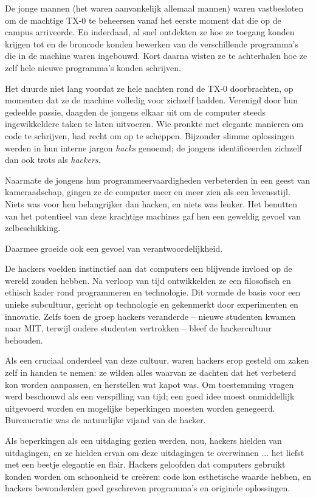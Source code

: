 \documentclass[
  a5paper,
  smalldemyvopaper,11pt,twoside,onecolumn,openright,extrafontsizes,
hidelinks]{memoir}
\begin{document}
De jonge mannen (het waren aanvankelijk allemaal mannen) waren
vastbesloten om de machtige TX-0 te beheersen vanaf het eerste moment
dat die op de campus arriveerde. En inderdaad, al snel ontdekten ze hoe
ze toegang konden krijgen tot en de broncode konden bewerken van de
verschillende programma's die in de machine waren ingebouwd. Kort daarna
wisten ze te achterhalen hoe ze zelf hele nieuwe programma's konden
schrijven.

Het duurde niet lang voordat ze hele nachten rond de TX-0 doorbrachten,
op momenten dat ze de machine volledig voor zichzelf hadden. Verenigd
door hun gedeelde passie, daagden de jongens elkaar uit om de computer
steeds ingewikkeldere taken te laten uitvoeren. Wie pronkte met elegante
manieren om code te schrijven, had recht om op te scheppen. Bijzonder
slimme oplossingen werden in hun interne jargon \emph{hacks} genoemd; de
jongens identificeerden zichzelf dan ook trots als \emph{hackers}.

Naarmate de jongens hun programmeervaardigheden verbeterden in een geest
van kameraadschap, gingen ze de computer meer en meer zien als een
levensstijl. Niets was voor hen belangrijker dan hacken, en niets was
leuker. Het benutten van het potentieel van deze krachtige machines gaf
hen een geweldig gevoel van zelbeschikking.

Daarmee groeide ook een gevoel van verantwoordelijkheid.

De hackers voelden instinctief aan dat computers een blijvende invloed
op de wereld zouden hebben. Na verloop van tijd ontwikkelden ze een
filosofisch en ethisch kader rond programmeren en technologie. Dit
vormde de basis voor een unieke subcultuur, gericht op technologie en
gekenmerkt door experimenten en innovatie. Zelfs toen de groep hackers
veranderde -- nieuwe studenten kwamen naar MIT, terwijl oudere studenten
vertrokken -- bleef de hackercultuur behouden.

Als een cruciaal onderdeel van deze cultuur, waren hackers erop gesteld
om zaken zelf in handen te nemen: ze wilden alles waarvan ze dachten dat
het verbeterd kon worden aanpassen, en herstellen wat kapot was. Om
toestemming vragen werd beschouwd als een verspilling van tijd; een goed
idee moest onmiddellijk uitgevoerd worden en mogelijke beperkingen
moesten worden genegeerd. Bureaucratie was de natuurlijke vijand van de
hacker.

Als beperkingen als een uitdaging gezien werden, nou, hackers hielden
van uitdagingen, en ze hielden ervan om deze uitdagingen te overwinnen
... het liefst met een beetje elegantie en flair. Hackers geloofden dat
computers gebruikt konden worden om schoonheid te creëren: code kon
esthetische waarde hebben, en hackers bewonderden goed geschreven
programma's en originele oplossingen.
\end{document}
